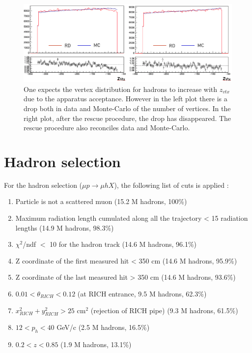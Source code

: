 \begin{figure}[!h]
	\includegraphics[scale=0.45]{./gfx/VertexDrop.png}
	\caption{One expects the vertex distribution for hadrons to increase with $z_{vtx}$ due to the apparatus acceptance. However in the left plot there is a drop both in data and Monte-Carlo of the number of vertices. In the right plot, after the rescue procedure, the drop has disappeared. The rescue procedure also reconciles data and Monte-Carlo.}
	\label{VertexDrop}
\end{figure}


\section{Hadron selection}

For the hadron selection ($\mu p \rightarrow \mu hX$), the following list of cuts is applied :
\begin{enumerate}
  \item Particle is not a scattered muon (15.2 M hadrons, 100\%)
  \item Maximum radiation length cumulated along all the trajectory < 15 radiation lengths (14.9 M hadrons, 98.3\%)
  \item $\chi^2$/ndf $<$ 10 for the hadron track (14.6 M hadrons, 96.1\%)
  \item Z coordinate of the first measured hit < 350 cm (14.6 M hadrons, 95.9\%)
  \item Z coordinate of the last measured hit > 350 cm (14.6 M hadrons, 93.6\%)
  \item $0.01 < \theta_{RICH} < 0.12$ (at RICH entrance, 9.5 M hadrons, 62.3\%)
  \item $x^2_{RICH} + y^2_{RICH} > 25$ cm$^2$ (rejection of RICH pipe) (9.3 M hadrons, 61.5\%)
  \item $12 < p_h < 40$ GeV/c (2.5 M hadrons, 16.5\%)
  \item $0.2 < z < 0.85$ (1.9 M hadrons, 13.1\%)
\end{enumerate}

